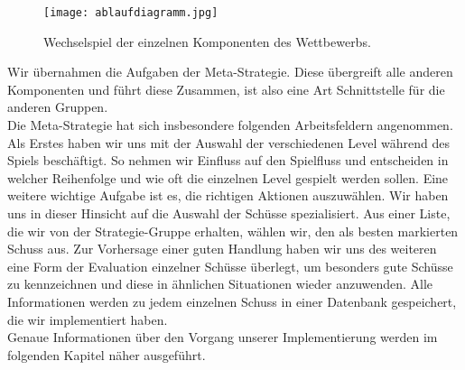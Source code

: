 \begin{figure} [h]
	\begin{center}
		\texttt{[image: ablaufdiagramm.jpg]}
		\caption{Wechselspiel der einzelnen Komponenten des Wettbewerbs.}
	\end{center}
\end{figure}

Wir übernahmen die Aufgaben der Meta-Strategie. Diese übergreift alle anderen Komponenten und führt diese Zusammen, ist also eine Art Schnittstelle für die anderen Gruppen.\\
Die Meta-Strategie hat sich insbesondere folgenden Arbeitsfeldern angenommen. Als Erstes haben wir uns mit der Auswahl der verschiedenen Level während des Spiels beschäftigt. So nehmen wir Einfluss auf den Spielfluss und entscheiden in welcher Reihenfolge und wie oft die einzelnen Level gespielt werden sollen.
Eine weitere wichtige Aufgabe ist es, die richtigen Aktionen auszuwählen. Wir haben uns in dieser Hinsicht auf die Auswahl der Schüsse spezialisiert. Aus einer Liste, die wir von der Strategie-Gruppe erhalten, wählen wir, den als besten markierten Schuss aus. Zur Vorhersage einer guten Handlung haben wir uns des weiteren eine Form der Evaluation einzelner Schüsse überlegt, um besonders gute Schüsse zu kennzeichnen und diese in ähnlichen Situationen wieder anzuwenden.
Alle Informationen werden zu jedem einzelnen Schuss in einer Datenbank gespeichert, die wir implementiert haben.\\
Genaue Informationen über den Vorgang unserer Implementierung werden im folgenden Kapitel näher ausgeführt.